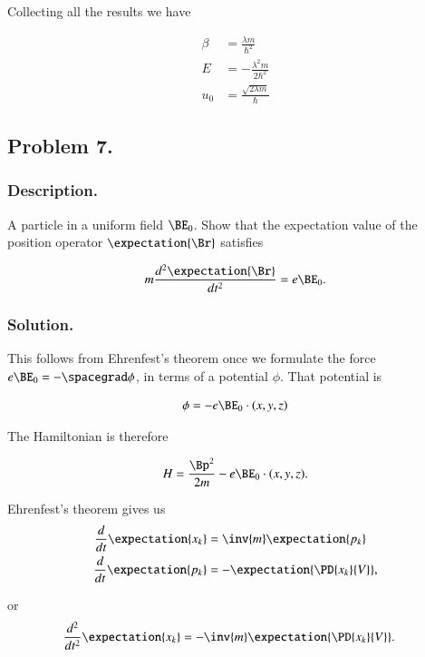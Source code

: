 Collecting all the results we have

\begin{align}\label{eqn:desaiCh3:705}
\beta &= \frac{\lambda m}{\hbar^2} \\
E &= -\frac{\lambda^2 m}{2 \hbar^2} \\
u_0 &= \frac{\sqrt{2 \lambda m}}{\hbar}
\end{align}

\subsection{Problem 7. }
\subsubsection{Description. }

A particle in a uniform field $\BE_0$.  Show that the expectation value of the position operator $\expectation{\Br}$ satisfies

\begin{align}\label{eqn:desaiCh3:600}
m \frac{d^2 \expectation{\Br} }{dt^2} = e \BE_0.
\end{align}

\subsubsection{Solution. }

This follows from Ehrenfest's theorem once we formulate the force $e \BE_0 = -\spacegrad \phi$, in terms of a potential $\phi$.  That potential is

\begin{align}\label{eqn:desaiCh3:601}
\phi = - e \BE_0 \cdot (x,y,z)
\end{align}

The Hamiltonian is therefore

\begin{align}\label{eqn:desaiCh3:602}
H = \frac{\Bp^2}{2m} - e \BE_0 \cdot (x,y,z).
\end{align}

Ehrenfest's theorem gives us
\begin{align*}
\frac{d}{dt} \expectation{x_k} &= \inv{m} \expectation{p_k} \\
\frac{d}{dt} \expectation{p_k} &= -\expectation{ \PD{x_k}{V} },
\end{align*}

or
\begin{align}\label{eqn:desaiCh3:603}
\frac{d^2}{dt^2} \expectation{x_k} &= -\inv{m} \expectation{ \PD{x_k}{V} }.
\end{align}

